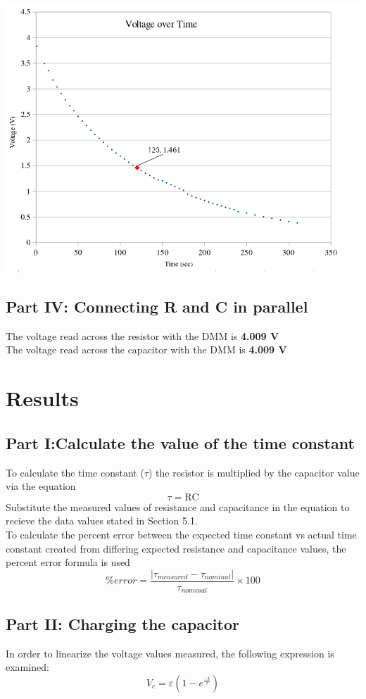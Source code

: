 \documentclass[titlepage]{article}
\begin{document}
		\FloatBarrier
		\begin{center}
\includegraphics[width=0.9\linewidth,frame]{help.png}
\end{center}
	\subsection{Part IV: Connecting R and C in parallel}
	The voltage read across the resistor with the DMM is \textbf{4.009 V}\\
The voltage read across the capacitor with the DMM is \textbf{4.009 V}\\
	\section{Results}
	\subsection{Part I:Calculate the value of the time constant}
	To calculate the time constant ($\tau$) the resistor is multiplied by the capacitor value via the equation 
	$$\tau = \text{RC}$$
	Substitute the measured values of resistance and capacitance in the equation to recieve the data values stated in Section 5.1.\\
	To calculate the percent error between the expected time constant vs actual time constant created from differing expected resistance and capacitance values, the percent error formula is used
	$$\% error = \frac{|\tau_{measured} - \tau_{nominal}|}{\tau_{nominal}} \times 100$$
	\subsection{Part II: Charging the capacitor}
	In order to linearize the voltage values measured, the following expression is examined:
	$$V_c = \varepsilon \left(1-e^{\frac{-t}{\tau}}\right)$$
\end{document}
